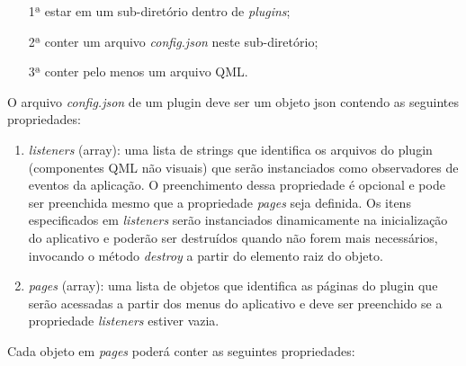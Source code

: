 \begin{enumerate}
	\item[1ª] estar em um sub-diretório dentro de \textit{plugins};
	\item[2ª] conter um arquivo \textit{config.json} neste sub-diretório;
	\item[3ª] conter pelo menos um arquivo QML.
\end{enumerate}

O arquivo \textit{config.json} de um plugin deve ser um objeto json contendo as seguintes propriedades:

\begin{enumerate}
	\item \textit{listeners} (array): uma lista de strings que identifica os arquivos do plugin (componentes QML não visuais) que serão instanciados como observadores de eventos da aplicação. O preenchimento dessa propriedade é opcional e pode ser preenchida mesmo que a propriedade \textit{pages} seja definida. Os itens especificados em \textit{listeners} serão instanciados dinamicamente na inicialização do aplicativo e poderão ser destruídos quando não forem mais necessários, invocando o método \textit{destroy} a partir do elemento raiz do objeto.

	\item \textit{pages} (array): uma lista de objetos que identifica as páginas do plugin que serão acessadas a partir dos menus do aplicativo e deve ser preenchido se a propriedade \textit{listeners} estiver vazia.
\end{enumerate}

Cada objeto em \textit{pages} poderá conter as seguintes propriedades:


